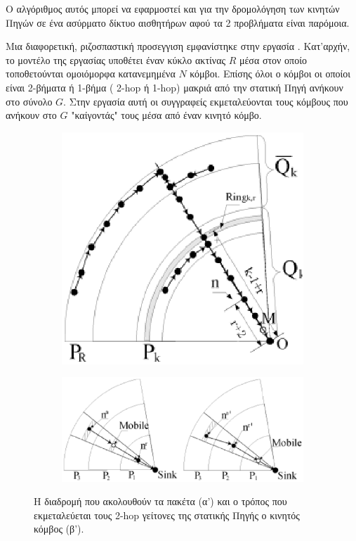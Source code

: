  Ο αλγόριθμος αυτός μπορεί να εφαρμοστεί και για την δρομολόγηση των κινητών Πηγών σε ένα ασύρματο δίκτυο αισθητήρων αφού τα 2 προβλήματα είναι παρόμοια.

Μια διαφορετική, ριζοσπαστική προσεγγιση εμφανίστηκε στην εργασία \cite{extending_lifetime_rizo}. Κατ'αρχήν, το μοντέλο της εργασίας υποθέτει έναν κύκλο ακτίνας $R$
μέσα στον οποίο τοποθετούνται ομοιόμορφα κατανεμημένα $N$ κόμβοι. Επίσης όλοι ο κόμβοι οι οποίοι είναι 2-βήματα ή 1-βήμα ( 2-hop ή 1-hop) μακριά από την στατική Πηγή
ανήκουν στο σύνολο $G$. Στην εργασία αυτή οι συγγραφείς εκμεταλεύονται τους κόμβους που ανήκουν στο $G$ "καίγοντάς" τους μέσα από έναν κινητό κόμβο.
\begin{figure}[h]
\begin{subfigure}{0.4\textwidth}
\centering
\includegraphics[scale=0.4]{images/extending_lifetime_1.eps}
\caption{}
\label{fig:extending_lifetime_path}
\end{subfigure}
\begin{subfigure}{0.5\textwidth}
\centering
\includegraphics[scale=0.5]{images/extending_lifetime_2.eps}
\caption{}
\label{fig:extending_lifetime_depletion}
\end{subfigure}
\caption{Η διαδρομή που ακολουθούν τα πακέτα (α') και ο τρόπος που εκμεταλεύεται τους 2-hop γείτονες της στατικής Πηγής ο κινητός κόμβος (β'). }
\label{fig:}
\end{figure}
